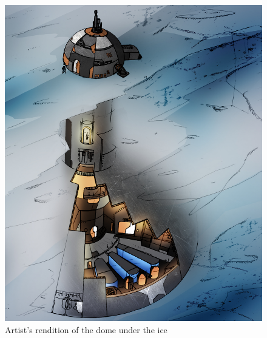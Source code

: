 \documentclass[fleqn,10pt]{Stylesheet} %
\begin{document}
\begin{figure}
    \centering
    \includegraphics[width=\linewidth]{art/dome_crop.jpg}
    \caption{Artist's rendition of the dome under the ice}
    \label{fig:dome}
\end{figure}



\end{document}
